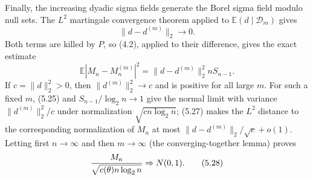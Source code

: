 \documentclass[11pt]{article}
\numberwithin{equation}{section}
\newcommand{\E}{\mathbb E}\newcommand{\Pp}{\mathbb P}
\newcommand{\1}{\mathbf 1}\newcommand{\F}{\mathcal F}\newcommand{\D}{\mathcal D}
\begin{document}
Finally, the increasing dyadic sigma fields generate the Borel sigma field
modulo null sets.  The $L^2$ martingale convergence theorem applied to
$\E(d\mid\mathcal D_m)$ gives
\begin{equation}\|d-d^{(m)}\|_2\longrightarrow0.             \tag{5.26}\end{equation}
Both terms are killed by $P$, so (4.2), applied to their difference, gives
the exact estimate
\begin{equation}
 \E|M_n-M_n^{(m)}|^2=\|d-d^{(m)}\|_2^2nS_{n-1}.              \tag{5.27}
\end{equation}
If $c=\|d\|_2^2>0$, then $\|d^{(m)}\|_2^2\to c$ and is positive for all
large $m$.  For such a fixed $m$, (5.25) and
$S_{n-1}/\log_2n\to1$ give the normal limit with variance
$\|d^{(m)}\|_2^2/c$ under normalization $\sqrt{cn\log_2n}$; (5.27) makes
the $L^2$ distance to the corresponding normalization of $M_n$ at most
$\|d-d^{(m)}\|_2/\sqrt c+o(1)$.  Letting first $n\to\infty$ and then
$m\to\infty$ (the converging-together lemma) proves
\begin{equation}
 {M_n\over\sqrt{c(\theta)n\log_2n}}\Rightarrow N(0,1).
                                                                    \tag{5.28}
\end{equation}
\end{document}
